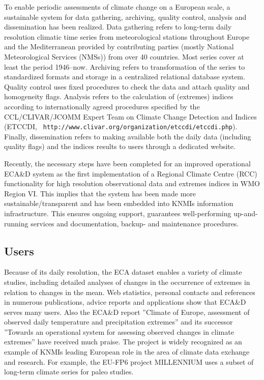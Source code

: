 \documentclass[a4paper,11pt]{article}
\begin{document}
To enable periodic assessments of climate change on a European scale,
a sustainable system for data gathering, archiving, quality control,
analysis and dissemination has been realized. Data gathering refers to
long-term daily resolution climatic time series from meteorological
stations throughout Europe and the Mediterranean provided by
contributing parties (mostly National Meteorological Services (NMSs))
from over 40 countries. Most series cover at least the period
1946--now. Archiving refers to transformation of the series to
standardized formats and storage in a centralized relational database
system. Quality control uses fixed procedures to check the data and
attach quality and homogeneity flags. Analysis refers to the
calculation of (extremes) indices according to internationally agreed
procedures specified by the CCL/CLIVAR/JCOMM Expert Team on Climate
Change Detection and Indices (ETCCDI, {\tt
http://www.clivar.org/organization/etccdi/etccdi.php}). Finally,
dissemination refers to making available both the daily data
(including quality flags) and the indices results to users through a
dedicated website.

Recently, the necessary steps have been completed for an improved
operational ECA\&D system as the first implementation of a Regional
Climate Centre (RCC) functionality for high resolution observational
data and extremes indices in WMO Region VI. This implies that the
system has been made more sustainable/transparent and has been
embedded into KNMIs information infrastructure. This ensures ongoing
support, guarantees well-performing up-and-running services and
documentation, backup- and maintenance procedures.

\subsection{Users}
\label{sec:users}

Because of its daily resolution, the ECA dataset enables a variety of
climate studies, including detailed analyses of changes in the
occurrence of extremes in relation to changes in the mean. Web
statistics, personal contacts and references in numerous publications,
advice reports and applications show that ECA\&D serves many
users. Also the ECA\&D report ''Climate of Europe, assessment of
observed daily temperature and precipitation extremes''
\citep{kleintank2002b} and its successor ''Towards an operational
system for assessing observed changes in climate extremes''
\citep{engelen} have received much praise. The project is widely
recognized as an example of KNMIs leading European role in the area of
climate data exchange and research. For example, the EU-FP6 project
MILLENNIUM uses a subset of long-term climate series for paleo
studies.
\end{document}
